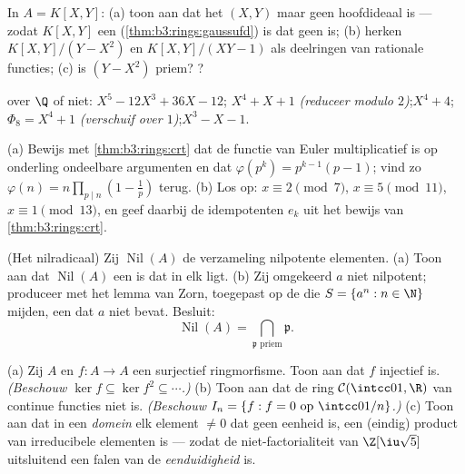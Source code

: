 \begin{exercise}[$\star\star$]\label{exo:b3:rings:6}
In $A = K[X, Y]$: (a) toon aan dat het  $(X, Y)$ 
maar geen hoofdideaal is --- zodat $K[X,Y]$ een 
(\cref{thm:b3:rings:gaussufd}) is dat geen  is;
(b) herken $K[X, Y]/(Y - X^2)$ en $K[X,Y]/(XY - 1)$ als deelringen
van rationale functies; (c) is $(Y - X^2)$ priem? ?
\end{exercise}

\begin{exercise}[$\star\star$]\label{exo:b3:rings:7}
 over $\Q$ of niet: $X^5 - 12X^3 + 36X - 12$;\quad
$X^4 + X + 1$ \emph{(reduceer modulo $2$)};\quad $X^4 + 4$;\quad
$\Phi_8 = X^4 + 1$ \emph{(verschuif over $1$)};\quad $X^3 - X - 1$.
\end{exercise}

\begin{exercise}[$\star\star$]\label{exo:b3:rings:8}
(a) Bewijs met \cref{thm:b3:rings:crt} dat de functie van Euler
multiplicatief is op onderling ondeelbare argumenten en dat
$\varphi(p^k) = p^{k-1}(p-1)$; vind zo $\varphi(n) = n\prod_{p \mid
n}(1 - \frac1p)$ terug.
(b) Los op: $x \equiv 2 \pmod 7$, $x \equiv 5 \pmod{11}$, $x \equiv
1 \pmod{13}$, en geef daarbij de idempotenten $e_k$ uit het bewijs
van \cref{thm:b3:rings:crt}.
\end{exercise}

\begin{exercise}[$\star\star\star$]\label{exo:b3:rings:9}
(Het nilradicaal) Zij $\operatorname{Nil}(A)$ de verzameling
nilpotente elementen. (a) Toon aan dat $\operatorname{Nil}(A)$ een
 is dat in elk  ligt. (b) Zij omgekeerd $a$ niet
nilpotent; produceer met het lemma van Zorn, toegepast op de
 die $S = \{a^n : n \in \N\}$ mijden, een  dat
$a$ niet bevat. Besluit:
\[
\operatorname{Nil}(A) = \bigcap_{\mathfrak p \text{ priem}}
\mathfrak p .
\]
\end{exercise}

\begin{exercise}[$\star\star\star$]\label{exo:b3:rings:10}
(a) Zij $A$  en $f \colon A \to A$ een surjectief
ringmorfisme. Toon aan dat $f$ injectief is. \emph{(Beschouw $\ker
f \subseteq \ker f^2 \subseteq \cdots$.)}
(b) Toon aan dat de ring $\mathcal C(\intcc01, \R)$ van continue
functies niet  is. \emph{(Beschouw $I_n = \{f : f = 0
\text{ op } \intcc0{1/n}\}$.)}
(c) Toon aan dat in een  \emph{domein} elk element $\neq 0$
dat geen eenheid is, een (eindig) product van irreducibele
elementen is --- zodat de niet-factorialiteit van
$\Z[\iu\sqrt 5]$ uitsluitend een falen van de
\emph{eenduidigheid} is.
\end{exercise}

